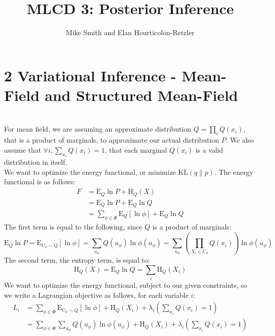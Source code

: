 \documentclass[12pt]{article}
\begin{document}
\title{MLCD 3: Posterior Inference}
\author{Mike Smith and Elan Hourticolon-Retzler}

\maketitle

\thispagestyle{empty}

\section*{2 Variational Inference - Mean-Field and Structured Mean-Field}
\\
For mean field, we are assuming an approximate distribution $Q = \prod_i Q(x_i)$, that is a product of marginals, to approximate our actual distribution $P$.  We also assume that $\forall i, \sum\limits_{x_i} Q(x_i) = 1$, that each marginal $Q(x_i)$ is a valid distribution in itself.\\
We want to optimize the energy functional, or minimize $\mathrm{KL}(q\|p)$.  The energy functional is as follows:
\begin{align*}
F &= \mathrm{E}_Q \ln P + \mathrm{H}_Q(X) \\
&= \mathrm{E}_Q \ln P + \mathrm{E}_Q \ln Q \\
&= \sum_{\phi \in \Phi} \mathrm{E}_Q [\ln \phi] + \mathrm{E}_Q \ln Q
\end{align*}
The first term is equal to the following, since $Q$ is a product of marginals:
\begin{equation*}
\mathrm{E}_Q \ln P = \mathrm{E}_{U_\phi \sim Q} [\ln \phi] = \sum_{u_\phi} Q(u_\phi) \ln \phi(u_\phi) = \sum_{u_\phi} \left( \prod_{X_i \in U_\phi } Q(x_i) \right) \ln \phi(u_\phi)
\end{equation*}
The second term, the entropy term, is equal to:
\begin{equation*}
\mathrm{H}_Q(X) = \mathrm{E}_Q \ln Q = \sum_i \mathrm{H}_Q(X_i)
\end{equation*}
We want to optimize the energy functional, subject to our given constraints, so we write a Lagrangian objective as follows, for each variable $i$:
\begin{align*}
L_i &= \sum_{\phi \in \Phi} \mathrm{E}_{U_\phi \sim Q} [\ln \phi] + \mathrm{H}_Q(X_i) + \lambda_i (\sum_{x_i} Q(x_i) = 1) \\
&= \sum_{\phi \in \Phi} \sum_{u_\phi} Q(u_\phi) \ln \phi(u_\phi) + \mathrm{H}_Q(X_i) + \lambda_i (\sum_{x_i} Q(x_i) = 1)
\end{align*}
\end{document}
